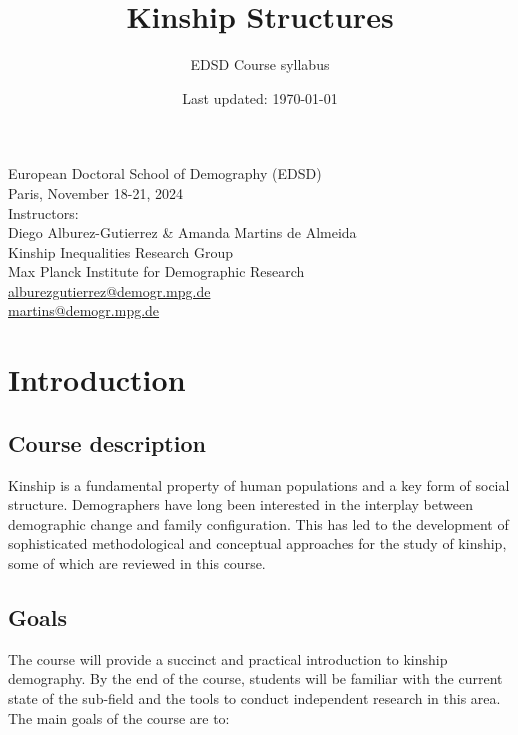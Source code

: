 \documentclass{article}
\title{Kinship Structures}
\author{EDSD Course syllabus}
\date{Last updated: \today}
\begin{document}
\maketitle

\noindent
European Doctoral School of Demography (EDSD)\\
Paris, November 18-21, 2024\\

\noindent
Instructors:\\
Diego Alburez-Gutierrez \& Amanda Martins de Almeida\\
Kinship Inequalities Research Group\\
Max Planck Institute for Demographic Research\\
\href{mailto:alburezgutierrez@demogr.mpg.de}{alburezgutierrez@demogr.mpg.de}\\
\href{mailto:martins@demogr.mpg.de}{martins@demogr.mpg.de}\\


\section{Introduction}

\subsection{Course description}

Kinship is a fundamental property of human populations and a key form of social structure.
Demographers have long been interested in the interplay between demographic change and family configuration.
This has led to the development of sophisticated methodological and conceptual approaches for the study of kinship, some of which are reviewed in this course. 

\subsection{Goals}

The course will provide a succinct and practical introduction to kinship demography. 
By the end of the course, students will be familiar with the current state of the sub-field and the tools to conduct independent research in this area. 
The main goals of the course are to:
\end{document}
